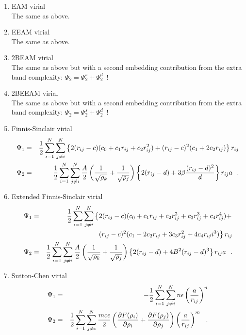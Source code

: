 \begin{enumerate}
\item EAM virial \\
The same as above.
\item EEAM virial \\
The same as above.
\item 2BEAM virial \\
The same as above but with a second embedding contribution from the extra band complexity:
$\Psi_{2}=\Psi^{s}_{2}+\Psi^{d}_{2}$~!
\item 2BEEAM virial \\
The same as above but with a second embedding contribution from the extra band complexity:
$\Psi_{2}=\Psi^{s}_{2}+\Psi^{d}_{2}$~!
\item Finnis-Sinclair virial
\begin{eqnarray}
\Psi_{1} &=& {1 \over 2} \sum_{i=1}^{N} \sum_{j \ne i}^{N}
\left\{ 2 (r_{ij}-c) (c_{0}+c_{1}r_{ij}+c_{2}r_{ij}^{2}) +
(r_{ij}-c)^{2} (c_{1}+2c_{2}r_{ij}) \right\} r_{ij} \nonumber \\
\Psi_{2} &=& {1 \over 2} \sum_{i=1}^{N} \sum_{j \ne i}^{N}
{A \over 2} \left( {1 \over \sqrt{\rho_{k}}} + {1 \over \sqrt{\rho_{j}}} \right)
\left\{ 2(r_{ij}-d) + 3 \beta \frac{(r_{ij}-d)^{2}}{d} \right\} r_{ij}a~~.
\end{eqnarray}
\item Extended Finnis-Sinclair virial
\begin{eqnarray}
\Psi_{1} &=& {1 \over 2} \sum_{i=1}^{N} \sum_{j \ne i}^{N}
\left\{ 2 (r_{ij}-c) (c_{0}+c_{1}r_{ij}+c_{2}r_{ij}^{2}+c_{3}r_{ij}^{3}+c_{4}r_{ij}^{4}) + \right. \nonumber \\
& & \phantom{xxxxxxxx} \left. (r_{ij}-c)^{2} (c_{1}+2c_{2}r_{ij}+3c_{3}r_{ij}^{2}+4c_{4}r_{ij}i^{3}) \right\} r_{ij} \\
\Psi_{2} &=& {1 \over 2} \sum_{i=1}^{N} \sum_{j \ne i}^{N}
{A \over 2} \left( {1 \over \sqrt{\rho_{k}}} + {1 \over \sqrt{\rho_{j}}} \right)
\left\{ 2(r_{ij}-d) + 4 B^{2} (r_{ij}-d)^{3} \right\} r_{ij}a~~. \nonumber
\end{eqnarray}
\item Sutton-Chen virial
\begin{eqnarray}
\Psi_{1} &=& -{1 \over 2} \sum_{i=1}^{N} \sum_{j \ne i}^{N} n \epsilon \left( \frac{a}{r_{ij}} \right)^{n} \nonumber \\
\Psi_{2} &=& {1 \over 2} \sum_{i=1}^{N} \sum_{j \ne i}^{N} \frac{m c \epsilon}{2} \left( \frac{\partial F(\rho_{i})}{\partial \rho_{i}} +
\frac{\partial F(\rho_{j})}{\partial \rho_{j}} \right) \left( \frac{a}{r_{ij}} \right)^{m}~~.

\end{eqnarray}
\end{enumerate}
